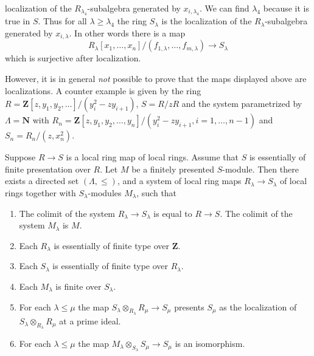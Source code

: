 \begin{remark}
\begin{enumerate}
localization of the $R_{\lambda_4}$-subalgebra generated
by $x_{i, \lambda_4}$. We can find $\lambda_4$ because it is
true in $S$. Thus for all $\lambda \geq \lambda_4$ the
ring $S_\lambda$ is the localization of the $R_\lambda$-subalgebra
generated by $x_{i, \lambda}$. In other words
there is a map
$$
R_\lambda[x_1,\ldots,x_n]/(f_{1, \lambda},\ldots,f_{m, \lambda})
\longrightarrow
S_\lambda
$$
which is surjective after localization.
\end{enumerate}
However, it is in general {\it not} possible to prove that
the maps displayed above are localizations. A counter example
is given by the ring
$R = \mathbf{Z}[z, y_1, y_2, \ldots]/(y_i^2 - zy_{i+1})$,
$S = R/zR$ and the system parametrized by $\Lambda = \mathbf{N}$
with $R_n = \mathbf{Z}[z, y_1, y_2, \ldots, y_n]/(y_i^2 - zy_{i+1}, 
i=1,\ldots,n-1)$ and $S_n = R_n/(z, x_n^2)$.
\end{remark}

\begin{lemma}
\label{lemma-limit-module-essentially-finite-presentation}
Suppose $R \to S$ is a local ring map of local rings.
Assume that $S$ is essentially of finite presentation over $R$.
Let $M$ be a finitely presented $S$-module.
Then there exists a directed set $(\Lambda, \leq)$, and
a system of local ring maps $R_\lambda \to S_\lambda$
of local rings together with $S_\lambda$-modules $M_\lambda$,
such that
\begin{enumerate}
\item The colimit of the system $R_\lambda \to S_\lambda$
is equal to $R \to S$. The colimit of the system $M_\lambda$
is $M$.
\item Each $R_\lambda$ is essentially of finite type
over $\mathbf{Z}$.
\item Each $S_\lambda$ is essentially of finite type
over $R_\lambda$.
\item Each $M_\lambda$ is finite over $S_\lambda$.
\item For each $\lambda \leq \mu$ the map
$S_\lambda \otimes_{R_\lambda} R_\mu \to S_\mu$
presents $S_\mu$ as the localization of
$S_\lambda \otimes_{R_\lambda} R_\mu$
at a prime ideal.
\item For each $\lambda \leq \mu$ the map
$M_\lambda \otimes_{S_\lambda} S_\mu \to S_\mu$
is an isomorphism.
\end{enumerate}
\end{lemma}

